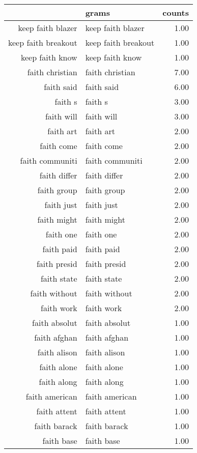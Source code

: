 \begin{table}[ht]
\centering
\begin{tabular}{rlr}
  \hline
 & grams & counts \\ 
  \hline
keep faith blazer & keep faith blazer & 1.00 \\ 
  keep faith breakout & keep faith breakout & 1.00 \\ 
  keep faith know & keep faith know & 1.00 \\ 
  faith christian & faith christian & 7.00 \\ 
  faith said & faith said & 6.00 \\ 
  faith s & faith s & 3.00 \\ 
  faith will & faith will & 3.00 \\ 
  faith art & faith art & 2.00 \\ 
  faith come & faith come & 2.00 \\ 
  faith communiti & faith communiti & 2.00 \\ 
  faith differ & faith differ & 2.00 \\ 
  faith group & faith group & 2.00 \\ 
  faith just & faith just & 2.00 \\ 
  faith might & faith might & 2.00 \\ 
  faith one & faith one & 2.00 \\ 
  faith paid & faith paid & 2.00 \\ 
  faith presid & faith presid & 2.00 \\ 
  faith state & faith state & 2.00 \\ 
  faith without & faith without & 2.00 \\ 
  faith work & faith work & 2.00 \\ 
  faith absolut & faith absolut & 1.00 \\ 
  faith afghan & faith afghan & 1.00 \\ 
  faith alison & faith alison & 1.00 \\ 
  faith alone & faith alone & 1.00 \\ 
  faith along & faith along & 1.00 \\ 
  faith american & faith american & 1.00 \\ 
  faith attent & faith attent & 1.00 \\ 
  faith barack & faith barack & 1.00 \\ 
  faith base & faith base & 1.00 \\ 

\end{tabular}
\end{table}
